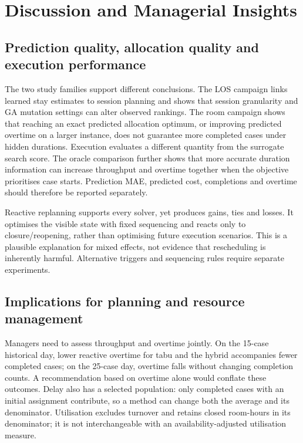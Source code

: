 \section{Discussion and Managerial Insights}
\label{sec:discussion}

\subsection{Prediction quality, allocation quality and execution performance}

The two study families support different conclusions. The LOS campaign links
learned stay estimates to session planning and shows that session granularity
and GA mutation settings can alter observed rankings. The room campaign
shows that reaching an exact predicted allocation optimum, or improving
predicted overtime on a larger instance, does not guarantee more completed
cases under hidden durations. Execution evaluates a different quantity from
the surrogate search score. The oracle comparison further shows that more
accurate duration information can increase throughput and overtime together
when the objective prioritises case starts. Prediction MAE, predicted cost,
completions and overtime should therefore be reported separately.

Reactive replanning supports every solver, yet produces gains, ties and
losses. It optimises the visible state with fixed sequencing and reacts only
to closure/reopening, rather than optimising future execution scenarios.
This is a plausible explanation for mixed effects, not evidence that
rescheduling is inherently harmful. Alternative triggers and sequencing
rules require separate experiments.

\subsection{Implications for planning and resource management}

Managers need to assess throughput and overtime jointly. On the 15-case
historical day, lower reactive overtime for tabu and the hybrid accompanies
fewer completed cases; on the 25-case day, overtime falls without changing
completion counts. A recommendation based on overtime alone would conflate
these outcomes. Delay also has a selected population: only completed cases
with an initial assignment contribute, so a method can change both the
average and its denominator. Utilisation excludes turnover and retains
closed room-hours in its denominator; it is not interchangeable with an
availability-adjusted utilisation measure.

